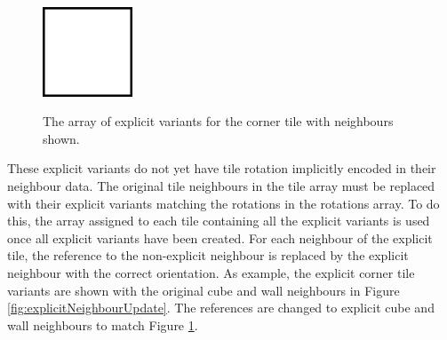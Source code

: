 \begin{figure}[H]
{\begin{minipage}[b]{0.22\linewidth}
            \includegraphics[width=0.2375\textwidth, height=0.1\textheight, keepaspectratio]{Images/CubeTile.png}
        \end{minipage}
        \label{fig:cornerRotationsArray3}
    }
    \caption{The array of explicit variants for the corner tile with neighbours shown.}
    \label{fig:cornerRotationsArray}
\end{figure}

These explicit variants do not yet have tile rotation implicitly encoded in their neighbour data. The original tile neighbours in the tile array must be replaced with their explicit variants matching the rotations in the rotations array. To do this, the array assigned to each tile containing all the explicit variants is used once all explicit variants have been created. For each neighbour of the explicit tile, the reference to the non-explicit neighbour is replaced by the explicit neighbour with the correct orientation. As example, the explicit corner tile variants are shown with the original cube and wall neighbours in Figure \ref{fig:explicitNeighbourUpdate}. The references are changed to explicit cube and wall neighbours to match Figure \ref{fig:cornerRotationsArray}.

